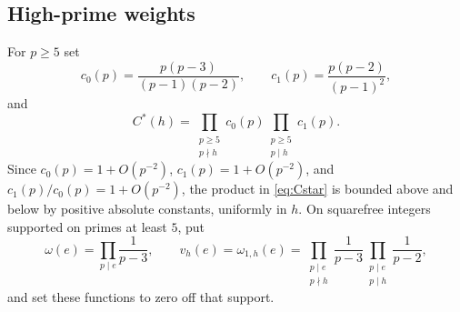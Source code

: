 \documentclass[11pt]{article}
\theoremstyle{definition}
\theoremstyle{remark}
\newcommand{\1}{\mathbf 1}
\newcommand{\om}{\omega}
\begin{document}
\subsection{High-prime weights}
For $p\ge5$ set
\[
c_0(p)=\frac{p(p-3)}{(p-1)(p-2)},\qquad
c_1(p)=\frac{p(p-2)}{(p-1)^2},
\]
and
\begin{equation}\label{eq:Cstar}
C^*(h)=\prod_{\substack{p\ge5\\p\nmid h}}c_0(p)
       \prod_{\substack{p\ge5\\p\mid h}}c_1(p).
\end{equation}
Since $c_0(p)=1+O(p^{-2})$, $c_1(p)=1+O(p^{-2})$, and
$c_1(p)/c_0(p)=1+O(p^{-2})$, the product in \cref{eq:Cstar} is
bounded above and below by positive absolute constants, uniformly in $h$.
On squarefree integers supported on primes at least $5$, put
\begin{equation}\label{eq:weights}
\om(e)=\prod_{p\mid e}\frac1{p-3},\qquad
v_h(e)=\om_{1,h}(e)
 =\prod_{\substack{p\mid e\\p\nmid h}}\frac1{p-3}
  \prod_{\substack{p\mid e\\p\mid h}}\frac1{p-2},
\end{equation}
and set these functions to zero off that support.
\end{document}
